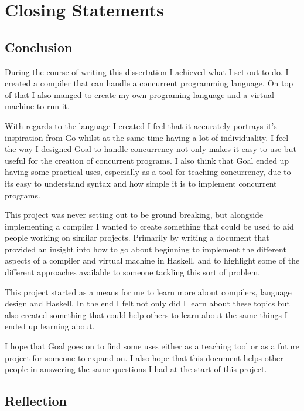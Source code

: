 
\chapter{Closing Statements}

\section{Conclusion}

During the course of writing this dissertation I achieved what I set out to do. I created a compiler that can handle a concurrent programming language. On top of that I also manged to create my own programing language and a virtual machine to run it. 

With regards to the language I created I feel that it accurately portrays it's inspiration from Go whilst at the same time having a lot of individuality. I feel the way I designed Goal to handle concurrency not only makes it easy to use but useful for the creation of concurrent programs. I also think that Goal ended up having some practical uses, especially as a tool for teaching concurrency, due to its easy to understand syntax and how simple it is to implement concurrent programs.

This project was never setting out to be ground breaking, but alongside implementing a compiler I wanted to create something that could be used to aid people working on similar projects. Primarily by writing a document that provided an insight into how to go about beginning to implement the different aspects of a compiler and virtual machine in Haskell, and to highlight some of the different approaches available to someone tackling this sort of problem.

This project started as a means for me to learn more about compilers, language design and Haskell. In the end I felt not only did I learn about these topics but also created something that could help others to learn about the same things I ended up learning about. 

I hope that Goal goes on to find some uses either as a teaching tool or as a future project for someone to expand on. I also hope that this document helps other people in answering the same questions I had at the start of this project. 

\newpage

\section{Reflection}


